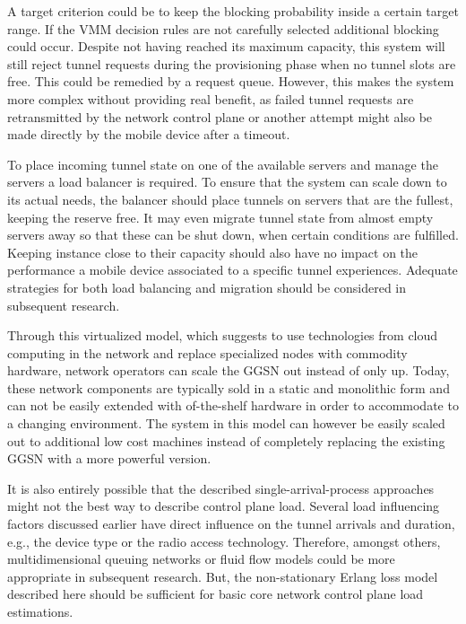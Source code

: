 A target criterion could be to keep the blocking probability inside a certain target range. If the \gls{VMM} decision rules are not carefully selected additional blocking could occur. Despite not having reached its maximum capacity, this system will still reject tunnel requests during the provisioning phase when no tunnel slots are free. This could be remedied by a request queue. However, this makes the system more complex without providing real benefit, as failed tunnel requests are retransmitted by the network control plane or another attempt might also be made directly by the mobile device after a timeout.

To place incoming tunnel state on one of the available servers and manage the servers a load balancer is required. To ensure that the system can scale down to its actual needs, the balancer should place tunnels on servers that are the fullest, keeping the reserve free. It may even migrate tunnel state from almost empty servers away so that these can be shut down, when certain conditions are fulfilled. Keeping instance close to their capacity should also have no impact on the performance a mobile device associated to a specific tunnel experiences. Adequate strategies for both load balancing and migration should be considered in subsequent research.

Through this virtualized model, which suggests to use technologies from cloud computing in the network and replace specialized nodes with commodity hardware, network operators can scale the \gls{GGSN} out instead of only up. Today, these network components are typically sold in a static and monolithic form and can not be easily extended with of-the-shelf hardware in order to accommodate to a changing environment. The system in this model can however be easily scaled out to additional low cost machines instead of completely replacing the existing \gls{GGSN} with a more powerful version. 

It is also entirely possible that the described single-arrival-process approaches might not the best way to describe control plane load. Several load influencing factors discussed earlier have direct influence on the tunnel arrivals and duration, e.g., the device type or the radio access technology. Therefore, amongst others, multidimensional queuing networks or fluid flow models could be more appropriate in subsequent research. But, the non-stationary Erlang loss model described here should be sufficient for basic core network control plane load estimations.

